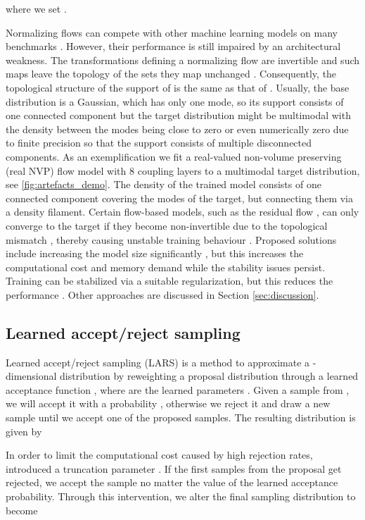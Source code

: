 \documentclass[twoside]{article}
\begin{document}
where we set .

Normalizing flows can compete with other machine learning models on many benchmarks \citep{Papamakarios2021}. However, their performance is still impaired by an architectural weakness. The transformations defining a normalizing flow are invertible and such maps leave the topology of the sets they map unchanged \citep{Runde2005}. Consequently, the topological structure of the support of  is the same as that of . Usually, the base distribution is a Gaussian, which has only one mode, so its support consists of one connected component but the target distribution might be multimodal with the density between the modes being close to zero or even numerically zero due to finite precision so that the support consists of multiple disconnected components. As an exemplification we fit a real-valued non-volume preserving (real NVP) flow model with 8 coupling layers to a multimodal target distribution, see \autoref{fig:artefacts_demo}. The density of the trained model consists of one connected component covering the modes of the target, but connecting them via a density filament. Certain flow-based models, such as the residual flow \citep{Behrmann2019,Chen2019a}, can only converge to the target if they become non-invertible due to the topological mismatch \citep{Cornish2020}, thereby causing unstable training behaviour \citep{Behrmann2021}. Proposed solutions include increasing the model size significantly \citep{Chen2019a}, but this increases the computational cost and memory demand while the stability issues persist. Training can be stabilized via a suitable regularization, but this reduces the performance \citep{Behrmann2021}. Other approaches are discussed in Section \ref{sec:discussion}.



\subsection{Learned accept/reject sampling}
\label{sec:back_rejection_sampling}

Learned accept/reject sampling (LARS) is a method to approximate a -dimensional distribution  by reweighting a proposal distribution  through a learned acceptance function , where  are the learned parameters \citep{Bauer2019}. Given a sample  from , we will accept it with a probability , otherwise we reject it and draw a new sample until we accept one of the proposed samples. The resulting distribution is given by

In order to limit the computational cost caused by high rejection rates, \cite{Bauer2019} introduced a truncation parameter . If the first  samples from the proposal get rejected, we accept the  sample no matter the value of the learned acceptance probability. Through this intervention, we alter the final sampling distribution to become
\end{document}
